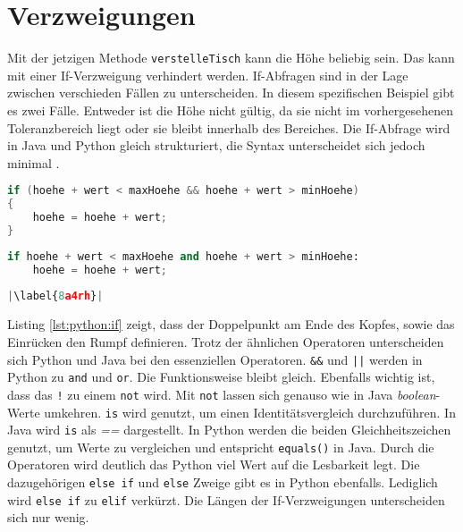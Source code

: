\section{Verzweigungen}
Mit der jetzigen Methode \texttt{verstelleTisch} kann die Höhe beliebig sein. Das kann mit einer If-Verzweigung verhindert werden. If-Abfragen sind in der Lage zwischen verschieden Fällen zu unterscheiden. In diesem spezifischen Beispiel gibt es zwei Fälle. Entweder ist die Höhe nicht gültig, da sie nicht im vorhergesehenen Toleranzbereich liegt oder sie bleibt innerhalb des Bereiches. Die If-Abfrage wird in Java und Python gleich strukturiert, die Syntax unterscheidet sich jedoch minimal \cite{Louis:2010}\cite{Python3:Buch}. 

\begin{minipage}{.5\linewidth}
\begin{lstlisting}[language=java,caption={If-Abfrage in Java},captionpos=b,label={lst:java:if},frame=none]
if (hoehe + wert < maxHoehe && hoehe + wert > minHoehe)
{
    hoehe = hoehe + wert;
}
\end{lstlisting}
\end{minipage}
\begin{minipage}{.5\linewidth}
\begin{lstlisting}[language=python,caption={If-Abfrage in Python},captionpos=b,label={lst:python:if},frame=l,escapechar=|]
if hoehe + wert < maxHoehe and hoehe + wert > minHoehe:
    hoehe = hoehe + wert;
    
|\label{8a4rh}|
\end{lstlisting}
\end{minipage}

Listing \ref{lst:python:if} zeigt, dass der Doppelpunkt am Ende des Kopfes, sowie das Einrücken den Rumpf definieren.
Trotz der ähnlichen Operatoren unterscheiden sich Python und Java bei den essenziellen Operatoren. \texttt{\&\&} und \texttt{||} werden in Python zu \texttt{and} und \texttt{or}. Die Funktionsweise bleibt gleich. Ebenfalls wichtig ist, dass das \texttt{!} zu einem \texttt{not} wird. Mit \texttt{not} lassen sich genauso wie in Java \textit{boolean}-Werte umkehren. \texttt{is} wird genutzt, um einen Identitätsvergleich durchzuführen. In Java wird \texttt{is} als \textit{==} dargestellt. In Python werden die beiden Gleichheitszeichen genutzt, um Werte zu vergleichen und entspricht \texttt{equals()} in Java. Durch die Operatoren wird deutlich das Python viel Wert auf die Lesbarkeit legt. Die dazugehörigen \texttt{else if} und \texttt{else} Zweige gibt es in Python ebenfalls. Lediglich wird \texttt{else if} zu \texttt{elif} verkürzt.  Die Längen der If-Verzweigungen unterscheiden sich nur wenig. \cite{Louis:2010}\cite{Python3:Buch}\par

